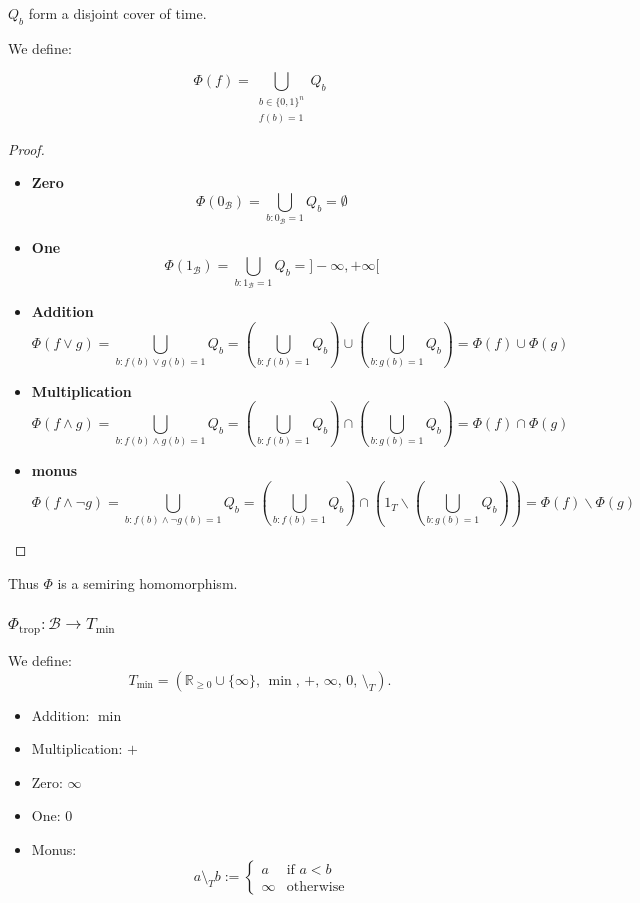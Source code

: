 $Q_b$ form a disjoint cover of time.

We define:

$$
\Phi(f) = \bigcup_{\substack{b \in \{0,1\}^n \\ f(b) = 1}} Q_b
$$

\begin{proof}
\begin{itemize}
\item \textbf{Zero}
$$
\Phi(0_{\mathcal{B}}) = \bigcup_{b:0_\mathcal{B}=1} Q_b = \emptyset
$$

\item
\textbf{One}
$$
\Phi(1_{\mathcal{B}}) = \bigcup_{b:1_\mathcal{B}=1} Q_b = ]-\infty, +\infty[
$$
\item
\textbf{Addition}
$$
\Phi(f \lor g)
= \bigcup_{b: f(b) \lor g(b) = 1} Q_b
= \left(\bigcup_{b: f(b) = 1} Q_b\right) \cup \left(\bigcup_{b: g(b) = 1} Q_b\right)
= \Phi(f) \cup \Phi(g)
$$
\item
\textbf{Multiplication}
$$
\Phi(f \land g)
= \bigcup_{b: f(b) \land g(b) = 1} Q_b
= \left(\bigcup_{b: f(b) = 1} Q_b\right) \cap \left(\bigcup_{b: g(b) = 1} Q_b\right)
= \Phi(f) \cap \Phi(g)
$$
\item
\textbf{monus}
$$
\Phi(f \land \neg g)
= \bigcup_{b: f(b) \land \neg g(b) = 1} Q_b
= \left(\bigcup_{b: f(b) = 1} Q_b\right) \cap \left(1_T \backslash \left(\bigcup_{b: g(b) = 1} Q_b\right)\right)
= \Phi(f) \backslash \Phi(g)
$$
    

\end{itemize}

\end{proof}

Thus $\Phi$ is a semiring homomorphism.

\subsubsection{$\Phi_{\mathrm{trop}}: \mathcal{B} \to T_{\min}$}

We define:
$$
T_{\min} = (\mathbb{R}_{\ge 0} \cup \{\infty\},\,\min,\,+,\,\infty,\,0,\,\setminus_T).
$$
\begin{itemize}
    \item Addition: \(\min\)
    \item Multiplication: \(+\)
    \item Zero: \(\infty\)
    \item One: \(0\)
    \item Monus:
    \[
    a \setminus_T b :=
    \begin{cases}
        a & \text{if } a < b \\
        \infty & \text{otherwise}
    \end{cases}
    \]
\end{itemize}



